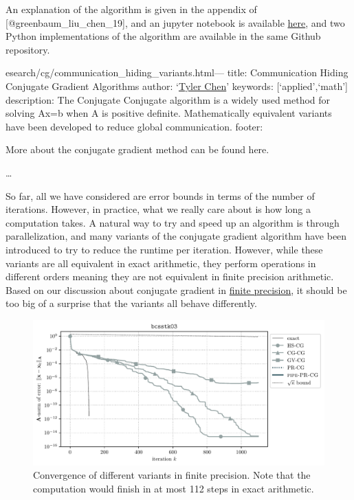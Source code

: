 \documentclass[10pt]{article}
\makeatletter
\def\maxwidth{\ifdim\Gin@nat@width>\linewidth\linewidth
\else\Gin@nat@width\fi}
\let\Oldincludegraphics\includegraphics
\renewcommand{\includegraphics}[1]{\Oldincludegraphics[width=\maxwidth]{#1}}
\makeatother
\begin{document}
An explanation of the algorithm is given in the appendix of {[}@greenbaum\_liu\_chen\_19{]}, and an jupyter notebook is available \href{https://github.com/tchen01/Conjugate_Gradient/blob/master/experiments/extend_t.ipynb}{here}, and two Python implementations of the algorithm are available in the same Github repository.

esearch/cg/communication\_hiding\_variants.html---
title: Communication Hiding Conjugate Gradient Algorithms
author: `\href{https://chen.pw}{Tyler Chen}'
keywords: {[}`applied',`math'{]}
description: The Conjugate Conjugate algorithm is a widely used method for solving Ax=b when A is positive definite. Mathematically equivalent variants have been developed to reduce global communication.
footer:

More about the conjugate gradient method can be found here.

\ldots{}

So far, all we have considered are error bounds in terms of the number of iterations.
However, in practice, what we really care about is how long a computation takes.
A natural way to try and speed up an algorithm is through parallelization, and many variants of the conjugate gradient algorithm have been introduced to try to reduce the runtime per iteration.
However, while these variants are all equivalent in exact arithmetic, they perform operations in different orders meaning they are not equivalent in finite precision arithmetic.
Based on our discussion about conjugate gradient in \href{./finite_precision_cg.html}{finite precision}, it should be too big of a surprise that the variants all behave differently.

\begin{figure}
\centering
\includegraphics{./imgs/convergence.pdf}
\caption{Convergence of different variants in finite precision. Note that the computation would finish in at most 112 steps in exact arithmetic.}
\end{figure}
\end{document}
